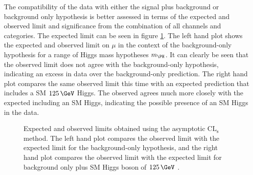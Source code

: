 The compatibility of the data with either the signal plus background or
background only hypothesis is better assessed in terms of the expected and observed
limit and significance from the combination of all channels and categories. The
expected limit can be seen in figure \ref{fig:results-limit}. The left hand plot
shows the expected and observed limit on $\mu$ in the context of the
background-only hypothesis for a range of Higgs mass hypotheses $m_{\PH}$. 
It can clearly be seen that the observed limit does not agree with the
background-only hypothesis, indicating an excess in data over the background-only
prediction. The right hand plot compares the same observed limit this time with
an expected prediction that includes a \ac{SM} $125\,\GeV$ Higgs. The observed
agrees much more closely with the expected including an \ac{SM} Higgs,
indicating the possible presence of an \ac{SM} Higgs in the data. 

\begin{figure}[h!]
\caption[Expected and observed limits on $\mu$ obtained using the asymptotic
$\mathrm{CL_{s}}$
method.]{Expected and observed limits obtained using the asymptotic
$\mathrm{CL_{s}}$
method. The left hand plot compares the observed limit with the expected limit
for the background-only hypothesis, and the right hand plot compares the observed
limit with the expected limit for background only plus \ac{SM} Higgs boson of
$125\,\GeV$ \cite{HIG-13-004}. }
\label{fig:results-limit}
\end{figure}

